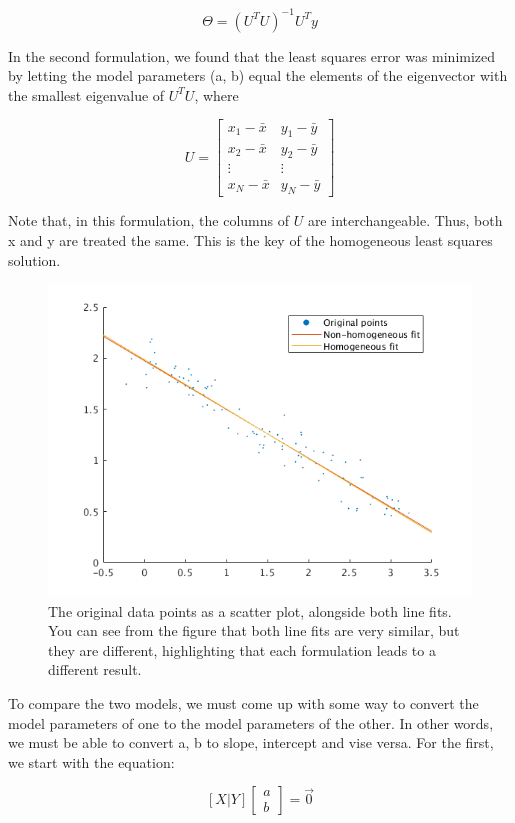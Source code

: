 \documentclass{article}
\begin{document}
$$
\Theta = (U^T U)^{-1} U^T y
$$

In the second formulation, we found that the least squares error was minimized 
by letting the model parameters (a, b) equal the elements of the eigenvector 
with the smallest eigenvalue of $U^T U$, where 

$$
U = \begin{bmatrix}
x_1 - \bar{x} & y_1 - \bar{y} \\
x_2 - \bar{x} & y_2 - \bar{y} \\
\vdots        & \vdots \\
x_N - \bar{x} & y_N - \bar{y}
\end{bmatrix}
$$

Note that, in this formulation, the columns of $U$ are interchangeable. Thus, 
both x and y are treated the same. This is the key of the homogeneous least 
squares solution.

\begin{figure}[!ht]
	\centering
	\includegraphics[width=120mm]{figs/line_fits.png}
	\caption{The original data points as a scatter plot, alongside both line 
        fits. You can see from the figure that both line fits are very similar, 
        but they are different, highlighting that each formulation leads to a 
        different result.}
\end{figure}

To compare the two models, we must come up with some way to convert the model 
parameters of one to the model parameters of the other. In other words, we must 
be able to convert a, b to slope, intercept and vise versa. For the first, we 
start with the equation:

$$
[X | Y] \begin{bmatrix}
a \\
b
\end{bmatrix} = \overrightarrow{0}
$$
\end{document}
